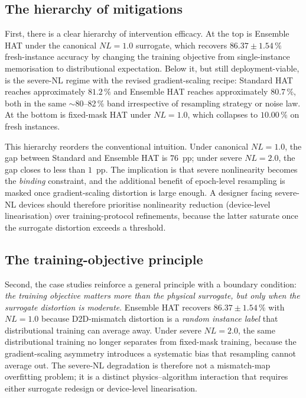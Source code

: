 \subsection{The hierarchy of mitigations}

First, there is a clear hierarchy of intervention efficacy.  At the top is Ensemble HAT under the canonical $NL=1.0$ surrogate, which recovers $86.37\pm1.54\,\%$ fresh-instance accuracy by changing the training objective from single-instance memorisation to distributional expectation.  Below it, but still deployment-viable, is the severe-NL regime with the revised gradient-scaling recipe: Standard HAT reaches approximately $81.2\,\%$ and Ensemble HAT reaches approximately $80.7\,\%$, both in the same $\sim$80--82\,\% band irrespective of resampling strategy or noise law.  At the bottom is fixed-mask HAT under $NL=1.0$, which collapses to $10.00\,\%$ on fresh instances.

This hierarchy reorders the conventional intuition.  Under canonical $NL=1.0$, the gap between Standard and Ensemble HAT is $76$~pp; under severe $NL=2.0$, the gap closes to less than $1$~pp.  The implication is that severe nonlinearity becomes the \emph{binding} constraint, and the additional benefit of epoch-level resampling is masked once gradient-scaling distortion is large enough.  A designer facing severe-NL devices should therefore prioritise nonlinearity reduction (device-level linearisation) over training-protocol refinements, because the latter saturate once the surrogate distortion exceeds a threshold.

\subsection{The training-objective principle}

Second, the case studies reinforce a general principle with a boundary condition: \emph{the training objective matters more than the physical surrogate, but only when the surrogate distortion is moderate}.  Ensemble HAT recovers $86.37\pm1.54\,\%$ with $NL=1.0$ because D2D-mismatch distortion is a \emph{random instance label} that distributional training can average away.  Under severe $NL=2.0$, the same distributional training no longer separates from fixed-mask training, because the gradient-scaling asymmetry introduces a systematic bias that resampling cannot average out.  The severe-NL degradation is therefore not a mismatch-map overfitting problem; it is a distinct physics--algorithm interaction that requires either surrogate redesign or device-level linearisation.

